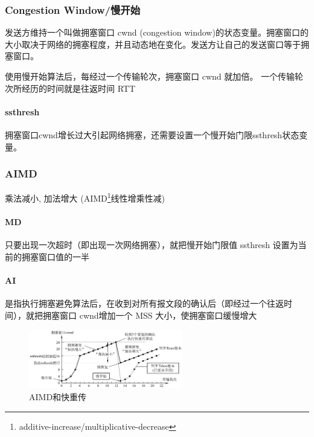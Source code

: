 \documentclass[a4paper]{report}
\begin{document}
\subsubsection{Congestion Window/慢开始}
\label{sec:tcp_cwnd}
发送方维持一个叫做拥塞窗口 cwnd (congestion window)的状态变量。拥塞窗口的大小取决于网络的拥塞程度，并且动态地在变化。发送方让自己的发送窗口等于拥塞窗口。

使用慢开始算法后，每经过一个传输轮次，拥塞窗口 cwnd 就加倍。 一个传输轮次所经历的时间就是往返时间 RTT

\paragraph{ssthresh}拥塞窗口cwnd增长过大引起网络拥塞，还需要设置一个慢开始门限ssthresh状态变量。

\subsubsection{AIMD}
乘法减小, 加法增大 (AIMD\footnote{additive-increase/multiplicative-decrease}线性增乘性减)
\paragraph{MD}只要出现一次超时（即出现一次网络拥塞），就把慢开始门限值 ssthresh 设置为当前的拥塞窗口值的一半
\paragraph{AI}是指执行拥塞避免算法后，在收到对所有报文段的确认后（即经过一个往返时间），就把拥塞窗口 cwnd增加一个 MSS 大小，使拥塞窗口缓慢增大
\begin{figure}[H]
\centering
\includegraphics[width=0.6\textwidth]{tcp_traffic.png}
\caption{AIMD和快重传}
\end{figure}
\end{document}
